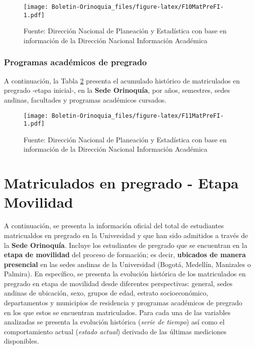 \documentclass[
]{book}
\begin{document}
\begin{figure}
\centering
\texttt{[image: Boletin-Orinoquia\_files/figure-latex/F10MatPreFI-1.pdf]}
\caption{\label{fig:F10MatPreFI}Fuente: Dirección Nacional de Planeación y Estadística con base en información de la Dirección Nacional Información Académica}
\end{figure}

\hypertarget{programas-acaduxe9micos-de-pregrado-2}{%
\subsubsection{Programas académicos de pregrado}\label{programas-acaduxe9micos-de-pregrado-2}}

A continuación, la Tabla \ref{fig:F11MatPreFI} presenta el acumulado histórico de matriculados en pregrado -etapa inicial-, en la \textbf{Sede Orinoquía}, por años, semestres, sedes andinas, facultades y programas académicos cursados.

\begin{figure}
\centering
\texttt{[image: Boletin-Orinoquia\_files/figure-latex/F11MatPreFI-1.pdf]}
\caption{\label{fig:F11MatPreFI}Fuente: Dirección Nacional de Planeación y Estadística con base en información de la Dirección Nacional Información Académica}
\end{figure}

\hypertarget{MatPreMov}{%
\section{Matriculados en pregrado - Etapa Movilidad}\label{MatPreMov}}

A continuación, se presenta la información oficial del total de estudiantes matricualdos en pregrado en la Universidad y que han sido admitidos a través de la \textbf{Sede Orinoquía}. Incluye los estudiantes de pregrado que se encuentran en la \textbf{etapa de movilidad} del proceso de formación; es decir, \textbf{ubicados de manera presencial} en las sedes andinas de la Universidad (Bogotá, Medellín, Manizales o Palmira). En específico, se presenta la evolución histórica de los matriculados en pregrado en etapa de movilidad desde diferentes perspectivas: general, sedes andinas de ubicación, sexo, grupos de edad, estrato socioeconómico, departamentos y municipios de residencia y programas académicos de pregrado en los que estos se encuentran matriculados. Para cada una de las variables analizadas se presenta la evolución histórica (\emph{serie de tiempo}) así como el comportamiento actual (\emph{estado actual}) derivado de las últimas mediciones disponibles.
\end{document}
